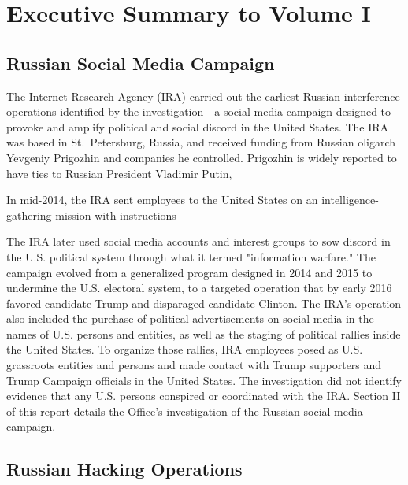 \section*{Executive Summary to Volume I}
\label{sec:executive-1}

\subsection*{Russian Social Media Campaign}

The Internet Research Agency (IRA) carried out the earliest Russian interference operations identified by the investigation---a social media campaign designed to provoke and amplify political and social discord in the United States.
The IRA was based in St.~Petersburg, Russia, and received funding from Russian oligarch Yevgeniy Prigozhin and companies he controlled.
Prigozhin is widely reported to have ties to Russian President Vladimir Putin, 

In mid-2014, the IRA sent employees to the United States on an intelligence-gathering mission with instructions 

The IRA later used social media accounts and interest groups to sow discord in the U.S. political system through what it termed "information warfare."
The campaign evolved from a generalized program designed in 2014 and 2015 to undermine the U.S. electoral system, to a targeted operation that by early 2016 favored candidate Trump and disparaged candidate Clinton.
The IRA's operation also included the purchase of political advertisements on social media in the names of U.S. persons and entities, as well as the staging of political rallies inside the United States.
To organize those rallies, IRA employees posed as U.S. grassroots entities and persons and made contact with Trump supporters and Trump Campaign officials in the United States.
The investigation did not identify evidence that any U.S. persons conspired or coordinated with the IRA\null.
Section II of this report details the Office's investigation of the Russian social media campaign.

\subsection*{Russian Hacking Operations}


